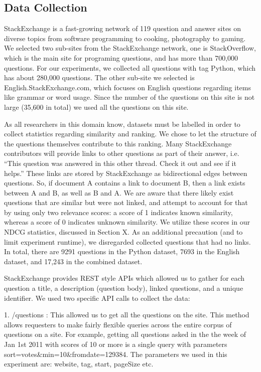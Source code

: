 \documentclass{acm_proc_article-sp}
\begin{document}
\subsection{Data Collection}
StackExchange is a fast-growing network of 119 question and answer sites on diverse topics from software programming to cooking, photography to gaming. We selected two sub-sites from the StackExchange network, one is StackOverflow, which is the main site for programing questions, and has more than 700,000 questions. For our experiments, we collected all questions with tag Python, which has about 280,000 questions. The other sub-site we selected is English.StackExchange.com, which focuses on English questions regarding items like grammar or word usage. Since the number of the questions on this site is not large (35,600 in total) we used all the questions on this site.  

As all researchers in this domain know, datasets must be labelled in order to collect statistics regarding similarity and ranking. We chose to let the structure of the questions themselves contribute to this ranking. Many StackExchange contributors will provide links to other questions as part of their answer, i.e. ``This question was answered in this other thread. Check it out and see if it helps.” These links are stored by StackExchange as bidirectional edges between questions. So, if document A contains a link to document B, then a link exists between A and B, as well as B and A. We are aware that there likely exist questions that are similar but were not linked, and attempt to account for that by using only two relevance scores: a score of 1 indicates known similarity, whereas a score of 0 indicates unknown similarity. We utilize these scores in our NDCG statistics, discussed in Section X. As an additional precaution (and to limit experiment runtime), we disregarded collected questions that had no links. In total, there are 9291 questions in the Python dataset, 7693 in the English dataset, and 17,243 in the combined dataset. 

StackExchange provides REST style APIs which allowed us to gather for each question a title, a description (question body), linked questions, and a unique identifier. We used two specific API calls to collect the data:

1. /questions : This allowed us to get all the questions on the site. This method allows requesters to make fairly flexible queries across the entire corpus of questions on a site. For example, getting all questions asked in the the week of Jan 1st 2011 with scores of 10 or more is a single query with parameters sort=votes\&min=10\&fromdate=129384. The parameters we used in this experiment are: website, tag, start, pageSize  etc. 
\end{document}
